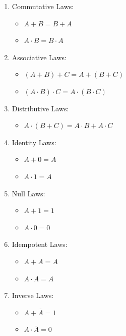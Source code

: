 \documentclass[
  a4paper,
]{article}
\providecommand{\tightlist}{%
  \setlength{\itemsep}{0pt}\setlength{\parskip}{0pt}}
\begin{document}
\begin{enumerate}
\def\labelenumi{\arabic{enumi}.}
\tightlist
\item
  Commutative Laws:

  \begin{itemize}
  \tightlist
  \item
    \(A + B = B + A\)
  \item
    \(A \cdot B = B \cdot A\)
  \end{itemize}
\item
  Associative Laws:

  \begin{itemize}
  \tightlist
  \item
    \((A + B) + C = A + (B + C)\)
  \item
    \((A \cdot B) \cdot C = A \cdot (B \cdot C)\)
  \end{itemize}
\item
  Distributive Laws:

  \begin{itemize}
  \tightlist
  \item
    \(A \cdot (B + C) = A \cdot B + A \cdot C\)
  \end{itemize}
\item
  Identity Laws:

  \begin{itemize}
  \tightlist
  \item
    \(A + 0 = A\)
  \item
    \(A \cdot 1 = A\)
  \end{itemize}
\item
  Null Laws:

  \begin{itemize}
  \tightlist
  \item
    \(A + 1 = 1\)
  \item
    \(A \cdot 0 = 0\)
  \end{itemize}
\item
  Idempotent Laws:

  \begin{itemize}
  \tightlist
  \item
    \(A + A = A\)
  \item
    \(A \cdot A = A\)
  \end{itemize}
\item
  Inverse Laws:

  \begin{itemize}
  \tightlist
  \item
    \(A + \overline{A} = 1\)
  \item
    \(A \cdot \overline{A} = 0\)
  \end{itemize}
\end{enumerate}
\end{document}
